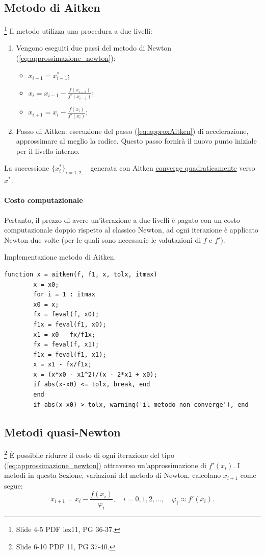 \subsection{Metodo di Aitken}
\footnote{Slide 4-5 PDF lez11, PG 36-37.}
Il metodo utilizza una procedura a due livelli:
\begin{enumerate}
	\item Vengono eseguiti due passi del metodo di Newton (\ref{eq:approssimazione_newton}): 
	\begin{itemize}
		\item $x_{i-1}=x_{i-1}^*$;
		\item $x_i=x_{i-1}-\frac{f(x_{i-1})}{f'(x_{i-1})}$;
		\item $x_{i+1}=x_i-\frac{f(x_i)}{f'(x_i)}$;
	\end{itemize}
	\item Passo di Aitken: esecuzione del passo (\ref{eq:approxAitken}) di accelerazione, approssimare al meglio la radice. Questo passo fornirà il nuovo punto iniziale per il livello interno.
\end{enumerate}
La successione $\{x_i^*\}_{i=1,2,\hdots}$ generata con Aitken \underline{converge quadraticamente} verso $x^*$.
\paragraph{Costo computazionale} Pertanto, il prezzo di avere un'iterazione a due livelli è pagato con un costo computazionale doppio rispetto al classico Newton, ad ogni iterazione è applicato Newton due volte (per le quali sono necessarie le valutazioni di $f$ e $f'$).

\begin{algorithm}
	\caption{Implementazione metodo di Aitken.}\label{alg:metAit}
	\begin{lstlisting}[style=Matlab-editor]
		function x = aitken(f, f1, x, tolx, itmax)
		x = x0;
		for i = 1 : itmax
		x0 = x;
		fx = feval(f, x0);
		f1x = feval(f1, x0);
		x1 = x0 - fx/f1x;
		fx = feval(f, x1);
		f1x = feval(f1, x1);
		x = x1 - fx/f1x;
		x = (x*x0 - x1^2)/(x - 2*x1 + x0);
		if abs(x-x0) <= tolx, break, end
		end
		if abs(x-x0) > tolx, warning('il metodo non converge'), end
	\end{lstlisting}
\end{algorithm}

\subsection{Metodi quasi-Newton}
\footnote{Slide 6-10 PDF 11, PG 37-40.}
È possibile ridurre il costo di ogni iterazione del tipo (\ref{eq:approssimazione_newton}) attraverso un'approssimazione di $f'(x_i)$. I metodi in questa Sezione, variazioni del metodo di Newton, calcolano $x_{i+1}$ come segue:
\begin{equation}\label{eq:approssimazione_quasi_newton}
	x_{i+1}=x_i-\frac{f(x_i)}{\varphi_i}, \quad i=0,1,2,\hdots, \quad\varphi_i\approx f'(x_i).
\end{equation}


